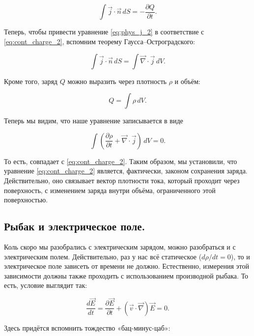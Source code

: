 \documentclass[a4paper,12pt]{article}
\newcommand{\pt}{\partial}
\newcommand{\vn}{\vec{\nabla}}
\begin{document}
\begin{equation}
  \label{eq:phys_j_2}
  \int \vec{j} \cdot \vec{n}\, dS = -\frac{\pt Q}{\pt t}.  
\end{equation}

Теперь, чтобы привести уравнение \eqref{eq:phys_j_2} в соответствие с
\eqref{eq:cont_charge_2}, вспомним теорему Гаусса--Остроградского: 

\begin{equation}
  \label{eq:phys_j_3}
   \int \vec{j} \cdot \vec{n}\, dS = \int \vn \cdot \vec{j}\, dV.
\end{equation}

Кроме того, заряд $Q$ можно выразить через плотность $\rho$ и объём: 

\begin{equation}
  \label{eq:phys_j_4}
  Q = \int \rho \, dV.
\end{equation}

Теперь мы видим, что наше уравнение записывается в виде 

\begin{equation}
  \label{eq:phys_j_5}
  \int \left( \frac{\pt \rho}{\pt t} + \vn \cdot \vec{j}  \right)\, dV
  = 0.
\end{equation}

То есть, совпадает с \eqref{eq:cont_charge_2}. Таким образом, мы
установили, что уравнение \eqref{eq:cont_charge_2} является,
фактически, законом сохранения заряда. Действительно, оно связывает
вектор плотности тока, который проходит через поверхность, с
изменением заряда внутри объёма, ограниченного этой поверхностью.

\subsection{Рыбак и электрическое поле.}
\label{sec:maxwell_eq_4}

Коль скоро мы разобрались с электрическим зарядом, можно разобраться и
с электрическим полем. Действительно, раз у нас всё статическое ($d\rho
/dt=0$), то и электрическое поле зависеть от времени не
должно. Естественно, измерения этой зависимости должны также проходить
с использованием производной рыбака. То есть, условие выглядит так: 

\begin{equation}
  \label{eq:mat_der_E}
  \frac{d\vec{E}}{dt} = \frac{\pt \vec{E}}{\pt t} + (\vec{v}\cdot \vn)
  \vec{E} = 0.
\end{equation}

Здесь придётся вспомнить тождество «бац-минус-цаб»: 
\end{document}
